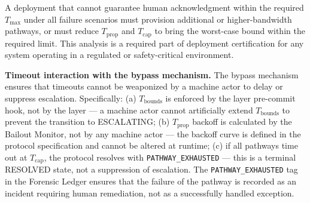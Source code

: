 A deployment that cannot guarantee human acknowledgment within the required $T_{\max}$ under all failure scenarios must provision additional or higher-bandwidth pathways, or must reduce $T_{\text{prop}}$ and $T_{\text{cap}}$ to bring the worst-case bound within the required limit. This analysis is a required part of deployment certification for any \bxthree{} system operating in a regulated or safety-critical environment.

\medskip\noindent\textbf{Timeout interaction with the bypass mechanism.} The bypass mechanism ensures that timeouts cannot be weaponized by a machine actor to delay or suppress escalation. Specifically: (a) $T_{\text{bounds}}$ is enforced by the \fact{} layer pre-commit hook, not by the \bounds{} layer — a machine actor cannot artificially extend $T_{\text{bounds}}$ to prevent the transition to ESCALATING; (b) $T_{\text{prop}}$ backoff is calculated by the Bailout Monitor, not by any machine actor — the backoff curve is defined in the protocol specification and cannot be altered at runtime; (c) if all pathways time out at $T_{\text{cap}}$, the protocol resolves with \texttt{PATHWAY\_EXHAUSTED} — this is a terminal RESOLVED state, not a suppression of escalation. The \texttt{PATHWAY\_EXHAUSTED} tag in the Forensic Ledger ensures that the failure of the pathway is recorded as an incident requiring human remediation, not as a successfully handled exception.